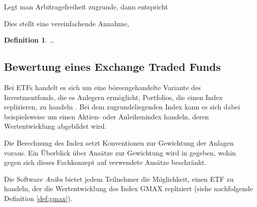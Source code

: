 \documentclass[12pt, a4paper]{article}
\theoremstyle{plain}
\newtheorem{definition}{Definition}
\begin{document}
Legt man Arbitragefreiheit zugrunde, dann entspricht 



Dies stellt eine vereinfachende Annahme, 

\begin{definition}
	\label{def:floater}
	\dots
\end{definition}


\subsection{Bewertung eines Exchange Traded Funds}
\label{sec:bewertung_eines_exchange_traded_funds}

Bei \glspl{ETF} handelt es sich um eine börsengehandelte Variante des Investmentfonds, die es Anlegern ermöglicht, Portfolios, die einen Index replizieren, zu handeln \autocite[][S.~103]{bodie_investments_2018}. Bei dem zugrundeliegenden Index kann es sich dabei beispielsweise um einen Aktien- oder Anleihenindex handeln, deren Wertentwicklung abgebildet wird.

Die Berechnung des Index setzt Konventionen zur Gewichtung der Anlagen voraus. Ein Überblick über Ansätze zur Gewichtung wird in \textcite[][S.~44~ff.]{bodie_investments_2018} gegeben, wohin gegen sich dieses Fachkonzept auf verwendete Ansätze beschränkt.

Die Software \textit{Anika} bietet jedem Teilnehmer die Möglichkeit, einen ETF zu handeln, der die Wertentwicklung des Index \gls{GMAX} repliziert (siehe nachfolgende Definition \ref{def:gmax}).
\end{document}
